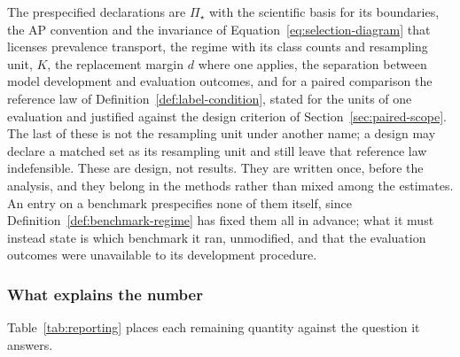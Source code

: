 \documentclass[11pt]{article}
\newcommand{\PSet}{\Pi_\star}
\theoremstyle{remark}
\begin{document}
The prespecified declarations are $\PSet$ with the scientific basis for its boundaries, the AP convention and the invariance of Equation~\eqref{eq:selection-diagram} that licenses prevalence transport, the regime with its class counts and resampling unit, $K$, the replacement margin $d$ where one applies, the separation between model development and evaluation outcomes, and for a paired comparison the reference law of Definition~\ref{def:label-condition}, stated for the units of one evaluation and justified against the design criterion of Section~\ref{sec:paired-scope}. The last of these is not the resampling unit under another name; a design may declare a matched set as its resampling unit and still leave that reference law indefensible. These are design, not results. They are written once, before the analysis, and they belong in the methods rather than mixed among the estimates. An entry on a benchmark prespecifies none of them itself, since Definition~\ref{def:benchmark-regime} has fixed them all in advance; what it must instead state is which benchmark it ran, unmodified, and that the evaluation outcomes were unavailable to its development procedure.

\subsubsection*{What explains the number}

Table~\ref{tab:reporting} places each remaining quantity against the question it answers.
\end{document}

